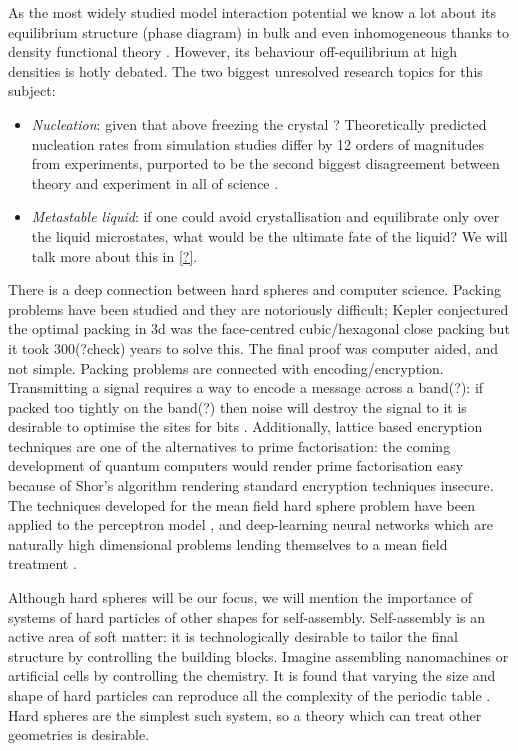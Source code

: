 \documentclass[11pt,twoside]{report}
\begin{document}
As the most widely studied model interaction potential we know a lot about its equilibrium structure (phase diagram) in bulk and even inhomogeneous thanks to density functional theory \cite{?,?,?}.
However, its behaviour off-equilibrium at high densities is hotly debated.
The two biggest unresolved research topics for this subject:
\begin{itemize}
\item \emph{Nucleation}: given that above freezing the crystal ? Theoretically predicted nucleation rates from simulation studies differ by 12 orders of magnitudes from experiments, purported to be the second biggest disagreement between theory and experiment in all of science \cite{?}.
\item \emph{Metastable liquid}: if one could avoid crystallisation and equilibrate only over the liquid microstates, what would be the ultimate fate of the liquid?
  We will talk more about this in \ref{?}.
\end{itemize}

There is a deep connection between hard spheres and computer science.
Packing problems have been studied \cite{Cohn,Conway,Sloane} and they are notoriously difficult; Kepler conjectured the optimal packing in 3d was the face-centred cubic/hexagonal close packing but it took 300(?check) years to solve this.
The final proof was computer aided, and not simple.
Packing problems are connected with encoding/encryption.
Transmitting a signal requires a way to encode a message across a band(?): if packed too tightly on the band(?) then noise will destroy the signal to it is desirable to optimise the sites for bits \cite{Cohn,?,?}.
Additionally, lattice based encryption techniques are one of the alternatives to prime factorisation: the coming development of quantum computers \cite{?,?} would render prime factorisation easy because of Shor's algorithm \cite{Shor?} rendering standard encryption techniques insecure.
The techniques developed for the mean field hard sphere problem have been applied to the perceptron model \cite{?}, and deep-learning neural networks which are naturally high dimensional problems lending themselves to a mean field treatment \cite{?}.

Although hard spheres will be our focus, we will mention the importance of systems of hard particles of other shapes for self-assembly.
Self-assembly is an active area of soft matter: it is technologically desirable to tailor the final structure by controlling the building blocks.
Imagine assembling nanomachines or artificial cells by controlling the chemistry.
It is found that varying the size and shape of hard particles can reproduce all the complexity of the periodic table \cite{Glotzer?,Dijkstra?}.
Hard spheres are the simplest such system, so a theory which can treat other geometries is desirable.
\end{document}
